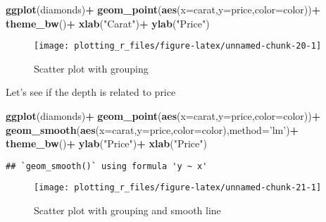 \documentclass[
]{book}
\newenvironment{Shaded}{\begin{snugshade}}{\end{snugshade}}
\newcommand{\DataTypeTok}[1]{\textcolor[rgb]{0.13,0.29,0.53}{#1}}
\newcommand{\KeywordTok}[1]{\textcolor[rgb]{0.13,0.29,0.53}{\textbf{#1}}}
\newcommand{\NormalTok}[1]{#1}
\newcommand{\OperatorTok}[1]{\textcolor[rgb]{0.81,0.36,0.00}{\textbf{#1}}}
\newcommand{\StringTok}[1]{\textcolor[rgb]{0.31,0.60,0.02}{#1}}
\begin{document}
\begin{Shaded}
\begin{Highlighting}[]
         \KeywordTok{ggplot}\NormalTok{(diamonds)}\OperatorTok{+}
\StringTok{          }\KeywordTok{geom_point}\NormalTok{(}\KeywordTok{aes}\NormalTok{(}\DataTypeTok{x=}\NormalTok{carat,}\DataTypeTok{y=}\NormalTok{price,}\DataTypeTok{color=}\NormalTok{color))}\OperatorTok{+}
\StringTok{  }\KeywordTok{theme_bw}\NormalTok{()}\OperatorTok{+}
\StringTok{  }\KeywordTok{xlab}\NormalTok{(}\StringTok{"Carat"}\NormalTok{)}\OperatorTok{+}\StringTok{ }\KeywordTok{ylab}\NormalTok{(}\StringTok{"Price"}\NormalTok{)}
\end{Highlighting}
\end{Shaded}

\begin{figure}

{\centering \texttt{[image: plotting\_r\_files/figure-latex/unnamed-chunk-20-1]} 

}

\caption{Scatter plot with grouping}\label{fig:unnamed-chunk-20}
\end{figure}

Let's see if the depth is related to price

\begin{Shaded}
\begin{Highlighting}[]
         \KeywordTok{ggplot}\NormalTok{(diamonds)}\OperatorTok{+}
\StringTok{          }\KeywordTok{geom_point}\NormalTok{(}\KeywordTok{aes}\NormalTok{(}\DataTypeTok{x=}\NormalTok{carat,}\DataTypeTok{y=}\NormalTok{price,}\DataTypeTok{color=}\NormalTok{color))}\OperatorTok{+}
\StringTok{  }\KeywordTok{geom_smooth}\NormalTok{(}\KeywordTok{aes}\NormalTok{(}\DataTypeTok{x=}\NormalTok{carat,}\DataTypeTok{y=}\NormalTok{price,}\DataTypeTok{color=}\NormalTok{color),}\DataTypeTok{method=}\StringTok{'lm'}\NormalTok{)}\OperatorTok{+}
\StringTok{  }\KeywordTok{theme_bw}\NormalTok{()}\OperatorTok{+}
\StringTok{  }\KeywordTok{ylab}\NormalTok{(}\StringTok{"Price"}\NormalTok{)}\OperatorTok{+}\StringTok{ }\KeywordTok{xlab}\NormalTok{(}\StringTok{"Price"}\NormalTok{)}
\end{Highlighting}
\end{Shaded}

\begin{verbatim}
## `geom_smooth()` using formula 'y ~ x'
\end{verbatim}

\begin{figure}

{\centering \texttt{[image: plotting\_r\_files/figure-latex/unnamed-chunk-21-1]} 

}

\caption{Scatter plot with grouping and smooth line}\label{fig:unnamed-chunk-21}
\end{figure}
\end{document}
